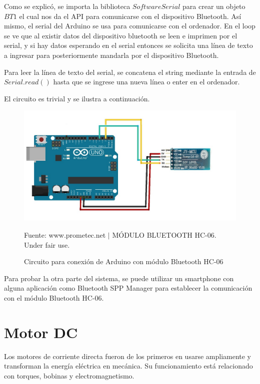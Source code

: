 \documentclass[conference]{IEEEtran}
\begin{document}
\bigbreak

Como se explicó, se importa la biblioteca $SoftwareSerial$ para crear un objeto $BT1$ el cual nos da el API para comunicarse con el dispositivo Bluetooth. Así mismo, el serial del Arduino se usa para comunicarse con el ordenador. En el loop se ve que al existir datos del dispositivo bluetooth se leen e imprimen por el serial, y si hay datos esperando en el serial entonces se solicita una línea de texto a ingresar para posteriormente mandarla por el dispositivo Bluetooth.

\bigbreak

Para leer la línea de texto del serial, se concatena el string mediante la entrada de $Serial.read()$ hasta que se ingrese una nueva línea o enter en el ordenador.

El circuito es trivial y se ilustra a continuación.

\begin{figure}[H]
\centering
\includegraphics[width=0.3\paperwidth]{images/bt-arduino-circuit}
\caption{Circuito para conexión de Arduino con módulo Bluetooth HC-06}
\footnotesize
Fuente: www.prometec.net $\mid$ MÓDULO BLUETOOTH HC-06. Under fair use. \cite{prometecnet-2019}
\end{figure}

Para probar la otra parte del sistema, se puede utilizar un smartphone con alguna aplicación como Bluetooth SPP Manager para establecer la comunicación con el módulo Bluetooth HC-06.

\section{Motor DC}

Los motores de corriente directa fueron de los primeros en usarse ampliamente y transforman la energía eléctrica en mecánica. Su funcionamiento está relacionado con torques, bobinas y electromagnetismo.
\end{document}

